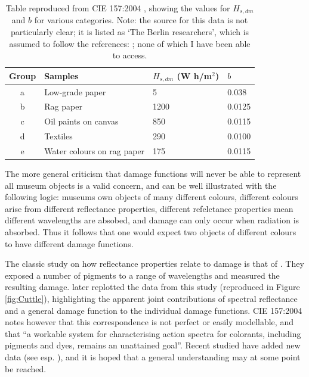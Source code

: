 \begin{table}[htbp]
\centering
\begin{tabular}{|c|l|l|l|}
\hline
Group & Samples & $H_{s,dm}$ (W h/m$^{2}$) & $b$ \\ \hline
a & Low-grade paper & 5 & 0.038 \\ \hline
b & Rag paper & 1200 & 0.0125 \\ \hline
c & Oil paints on canvas & 850 & 0.0115 \\ \hline
d & Textiles & 290 & 0.0100 \\ \hline
e & Water colours on rag paper & 175 & 0.0115 \\ \hline
\end{tabular}
\caption{Table reproduced from CIE 157:2004 \citep{cie_cie_2004}, showing the values for $H_{s,dm}$ and $b$ for various categories. Note: the source for this data is not particularly clear; it is listed as `The Berlin researchers', which is assumed to follow the references: \citet{krochmann_beleuchtung_1988,cie_cie_1991,hilbert_zur_1991}; none of which I have been able to access.}
\label{tab:b}
\end{table}

The more general criticism that damage functions will never be able to represent all museum objects is a valid concern, and can be well illustrated with the following logic: museums own objects of many different colours, different colours arise from different reflectance properties, different refelctance properties mean different wavelengths are absobed, and damage can only occur when radiation is absorbed. Thus it follows that one would expect two objects of different colours to have different damage functions. 

The classic study on how reflectance properties relate to damage is that of \citet{saunders_wavelength-dependent_1994}. They exposed a number of pigments to a range of wavelengths and measured the resulting damage. \citet{cuttle_control_1999} later replotted the data from this study (reproduced in Figure \ref{fig:Cuttle}), highlighting the apparent joint contributions of spectral reflectance and a general damage function to the individual damage functions. CIE 157:2004 notes however that this correspondence is not perfect or easily modellable, and that ``a workable system for characterising action spectra for colorants, including pigments and dyes, remains an unattained goal''. Recent studied have added new data (see esp. \citet{villmann_wavelength_2018}), and it is hoped that a general understanding may at some point be reached.

